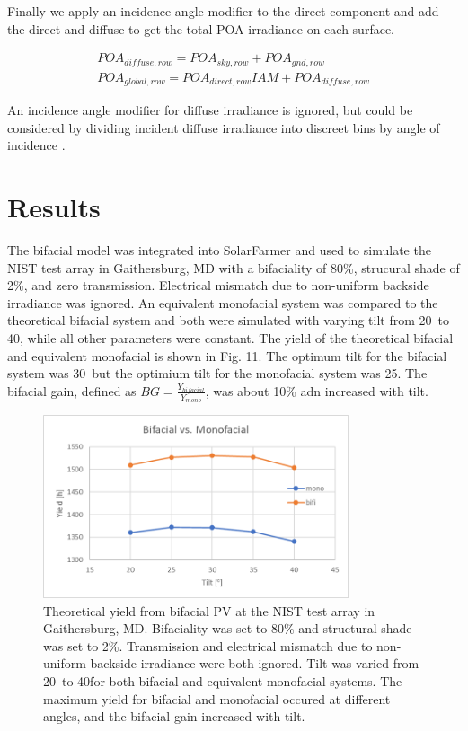 \documentclass[conference]{IEEEtran}
\begin{document}
Finally we apply an incidence angle modifier to the direct component and add the direct and diffuse to get the total POA irradiance on each surface.

\begin{align}
POA_{diffuse,row} = POA_{sky,row} + POA_{gnd,row}\\
POA_{global,row} = POA_{direct,row}IAM + POA_{diffuse,row}
\end{align}

An incidence angle modifier for diffuse irradiance is ignored, but could be considered by dividing incident diffuse irradiance into discreet bins by angle of incidence \cite{Marion2017}.

\section{Results}
The bifacial model was integrated into SolarFarmer and used to simulate the NIST test array in Gaithersburg, MD \cite{Mikofski_8547323} with a bifaciality of 80\%, strucural shade of 2\%, and zero transmission.  Electrical mismatch due to non-uniform backside irradiance was ignored.  An equivalent monofacial system was compared to the theoretical bifacial system and both were simulated with varying tilt from 20\degree\ to 40\degree, while all other parameters were constant.  The yield of the theoretical bifacial and equivalent monofacial is shown in Fig. 11.  The optimum tilt for the bifacial system was 30\degree\ but the optimium tilt for the monofacial system was 25\degree.  The bifacial gain, defined as $BG=\frac{Y_{bifacial}}{Y_{mono}}$, was about 10\% adn increased with tilt.

\begin{figure}
\centering
\includegraphics[width=9cm]{NIST_bifi-v-mono.png}
\caption{Theoretical yield from bifacial PV at the NIST test array in Gaithersburg, MD.  Bifaciality was set to 80\% and structural shade was set to 2\%.  Transmission and electrical mismatch due to non-uniform backside irradiance were both ignored.  Tilt was varied from 20\degree\ to 40\degree for both bifacial and equivalent monofacial systems.  The maximum yield for bifacial and monofacial occured at different angles, and the bifacial gain increased with tilt.}
\end{figure}
\end{document}

